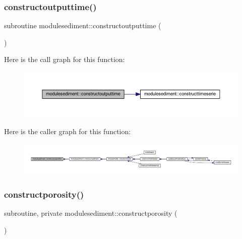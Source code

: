 \subsubsection{\texorpdfstring{constructoutputtime()}{constructoutputtime()}}
{\footnotesize\ttfamily subroutine modulesediment\+::constructoutputtime (\begin{DoxyParamCaption}{ }\end{DoxyParamCaption})\hspace{0.3cm}{\ttfamily [private]}}

Here is the call graph for this function\+:\nopagebreak
\begin{figure}[H]
\begin{center}
\leavevmode
\includegraphics[width=350pt]{namespacemodulesediment_aacb4e3dc70adfbda3e0d8000b2088b3d_cgraph}
\end{center}
\end{figure}
Here is the caller graph for this function\+:\nopagebreak
\begin{figure}[H]
\begin{center}
\leavevmode
\includegraphics[width=350pt]{namespacemodulesediment_aacb4e3dc70adfbda3e0d8000b2088b3d_icgraph}
\end{center}
\end{figure}
\mbox{\label{namespacemodulesediment_a8ad0bd3e4a8a8ea6fb423df13967b877}} 
\subsubsection{\texorpdfstring{constructporosity()}{constructporosity()}}
{\footnotesize\ttfamily subroutine, private modulesediment\+::constructporosity (\begin{DoxyParamCaption}{ }\end{DoxyParamCaption})\hspace{0.3cm}{\ttfamily [private]}}

